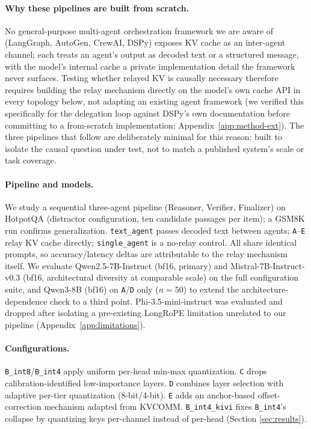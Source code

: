 \documentclass[11pt]{article}
\begin{document}
\paragraph{Why these pipelines are built from scratch.} No
general-purpose multi-agent orchestration framework we are aware of
(LangGraph, AutoGen, CrewAI, DSPy) exposes KV cache as an inter-agent
channel; each treats an agent's output as decoded text or a structured
message, with the model's internal cache a private implementation
detail the framework never surfaces. Testing whether relayed KV is
causally necessary therefore requires building the relay mechanism
directly on the model's own cache API in every topology below, not
adapting an existing agent framework (we verified this specifically for
the delegation loop against DSPy's own documentation before committing
to a from-scratch implementation; Appendix~\ref{app:method-ext}). The
three pipelines that follow are deliberately minimal for this reason:
built to isolate the causal question under test, not to match a
published system's scale or task coverage.

\paragraph{Pipeline and models.} We study a sequential three-agent
pipeline (Reasoner, Verifier, Finalizer) on HotpotQA
\citep{hotpotqa2018} (distractor configuration, ten candidate passages
per item); a GSM8K \citep{gsm8k2021} run confirms generalization.
\texttt{text\_agent} passes decoded text between agents;
\texttt{A}--\texttt{E} relay KV cache directly; \texttt{single\_agent}
is a no-relay control. All share identical prompts, so accuracy/latency
deltas are attributable to the relay mechanism itself. We evaluate
Qwen2.5-7B-Instruct \citep{qwen2p5_2024} (bf16, primary) and
Mistral-7B-Instruct-v0.3 \citep{mistral7b2023} (bf16, architectural
diversity at comparable scale) on the full configuration suite, and
Qwen3-8B (bf16) on \texttt{A}/\texttt{D} only ($n=50$) to extend the
architecture-dependence check to a third point. Phi-3.5-mini-instruct
was evaluated and dropped after isolating a pre-existing LongRoPE
limitation unrelated to our pipeline (Appendix~\ref{app:limitations}).

\paragraph{Configurations.} \texttt{B\_int8}/\texttt{B\_int4} apply
uniform per-head min-max quantization. \texttt{C} drops
calibration-identified low-importance layers. \texttt{D} combines
layer selection with adaptive per-tier quantization (8-bit/4-bit).
\texttt{E} adds an anchor-based offset-correction mechanism adapted
from KVCOMM. \texttt{B\_int4\_kivi} fixes \texttt{B\_int4}'s collapse by
quantizing keys per-channel instead of per-head (Section
\ref{sec:results}).
\end{document}
